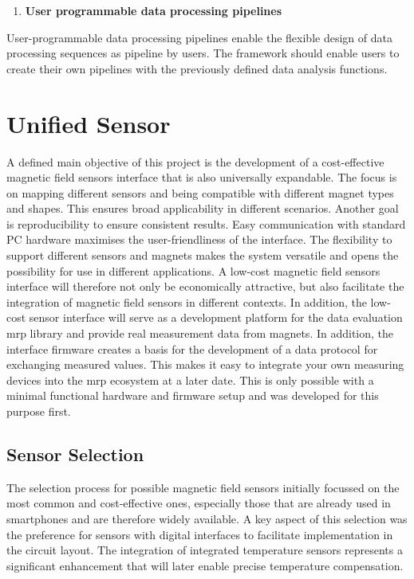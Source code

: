 \begin{enumerate}
\def\labelenumi{\arabic{enumi}.}
\setcounter{enumi}{4}
\tightlist
\item
  \textbf{User programmable data processing pipelines}
\end{enumerate}

User-programmable data processing pipelines enable the flexible design
of data processing sequences as pipeline by users. The framework should
enable users to create their own pipelines with the previously defined
data analysis functions.

\hypertarget{unified-sensor}{%
\chapter{Unified Sensor}\label{unified-sensor}}

A defined main objective of this project is the development of a
cost-effective magnetic field sensors interface that is also universally
expandable. The focus is on mapping different sensors and being
compatible with different magnet types and shapes. This ensures broad
applicability in different scenarios. Another goal is reproducibility to
ensure consistent results. Easy communication with standard PC hardware
maximises the user-friendliness of the interface. The flexibility to
support different sensors and magnets makes the system versatile and
opens the possibility for use in different applications. A low-cost
magnetic field sensors interface will therefore not only be economically
attractive, but also facilitate the integration of magnetic field
sensors in different contexts. In addition, the low-cost sensor
interface will serve as a development platform for the data evaluation
\gls{mrp} library and provide real measurement data from magnets. In
addition, the interface firmware creates a basis for the development of
a data protocol for exchanging measured values. This makes it easy to
integrate your own measuring devices into the \gls{mrp} ecosystem at a
later date. This is only possible with a minimal functional hardware and
firmware setup and was developed for this purpose first.

\hypertarget{sensor-selection}{%
\section{Sensor Selection}\label{sensor-selection}}

The selection process for possible magnetic field sensors initially
focussed on the most common and cost-effective ones, especially those
that are already used in smartphones and are therefore widely available.
A key aspect of this selection was the preference for sensors with
digital interfaces to facilitate implementation in the circuit layout.
The integration of integrated temperature sensors represents a
significant enhancement that will later enable precise temperature
compensation.

